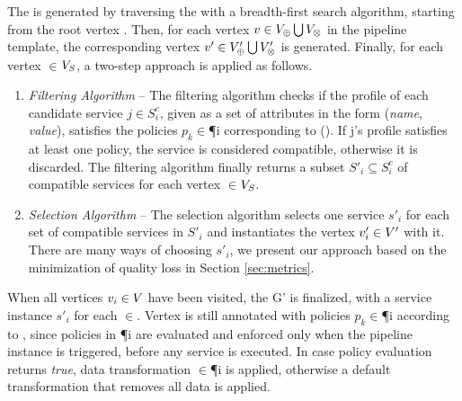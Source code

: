     The \pipelineInstance  is generated by traversing the \pipelineTemplate with a breadth-first search algorithm, starting from the root vertex .
    Then, for each vertex $v\in V_{\oplus}\bigcup V_{\otimes}$ in the pipeline template, the corresponding vertex $v'\in V'_{\oplus}\bigcup V'_{\otimes}$ is generated.
    Finally, for each vertex $\in$$V_S$, a two-step approach is applied as follows.

  \begin{enumerate}

    \item \textit{Filtering Algorithm} -- The filtering algorithm checks if the profile of each candidate service $\si{j} \in S^c_{i}$, given as a set of attributes in the form (\emph{name}, \emph{value}), satisfies the policies $p_k$$\in$\P{i} corresponding to \myLambda(). If \si{j}'s profile satisfies at least one policy, the service is considered compatible, otherwise it is discarded. The filtering algorithm finally returns a subset $S'_{i}\subseteq S^c_{i}$ of compatible services for each vertex $\in$$V_S$.
    \item \textit{Selection Algorithm} -- The selection algorithm selects one service $s'_i$ for each set of compatible services in $S'_{i}$ and instantiates the vertex $v'_{i}\in V'$ with it.  There are many ways of choosing $s'_i$, we present our approach based on the minimization of quality loss in Section \ref{sec:metrics}.
  \end{enumerate}

  When all vertices $v_{i}\in V$ have been visited, the \pipelineInstance G' is finalized, with a service instance $s'_i$ for each $\in$\Vp. Vertex  is still annotated with policies $p_k$$\in$\P{i} according to \myLambda, since policies in \P{i} are evaluated and enforced only when the pipeline instance is triggered, before any service is executed. In case policy evaluation returns \emph{true}, data transformation \TP$\in$\P{i} is applied, otherwise a default transformation that removes all data is applied.

